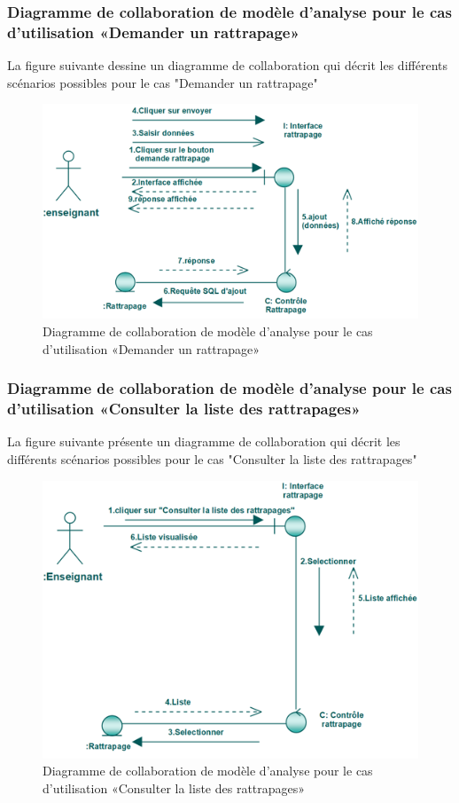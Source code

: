 \documentclass[12 pt ]{report}
\begin{document}
\subsubsection{Diagramme  de  collaboration  de  modèle  d'analyse  pour  le  cas  d'utilisation «Demander un rattrapage»  }
La figure suivante dessine un diagramme de collaboration qui décrit les différents
scénarios possibles pour le cas "Demander un rattrapage"
\begin{figure}[h]
\begin{center}
\includegraphics[width= 14 cm , height =4 cm]{colla_ens_demande_rattrapage.PNG}
 \caption{Diagramme  de  collaboration  de  modèle  d'analyse  pour  le  cas  d'utilisation «Demander un rattrapage»}
\end{center}
\end{figure}  \newpage
\subsubsection{Diagramme  de  collaboration  de  modèle  d'analyse  pour  le  cas  d'utilisation «Consulter la liste des rattrapages»  }
La figure suivante présente un diagramme de collaboration qui décrit les différents
scénarios possibles pour le cas "Consulter la liste des rattrapages"
\begin{figure}[h]
\begin{center}
\includegraphics[width= 12 cm , height =5 cm]{cce.PNG}
 \caption{Diagramme  de  collaboration  de  modèle  d'analyse  pour  le  cas  d'utilisation «Consulter la liste des rattrapages»}
\end{center}
\end{figure}
\end{document}
